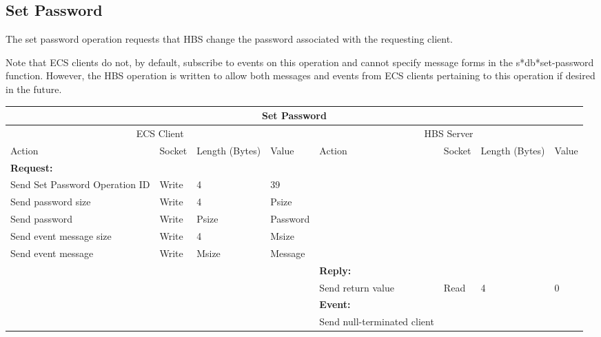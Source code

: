 \newpage
\subsection{Set Password}

The set password operation requests that HBS change the password
associated with the requesting client. 

Note that ECS clients do not, by default, subscribe to events on this
operation and cannot specify message forms in the s*db*set-password
function.  However, the HBS operation is written to allow both messages and
events from ECS clients pertaining to this operation if desired in the future.

\bigskip
\small
\begin{tabular}{|p{1.2in}|p{.4in}|p{.4in}|p{.5in}|p{1.2in}|p{.4in}|p{.4in}|p{.5in} |} \hline
\multicolumn{8}{|c|}{{\bf Set Password}} \\ \hline
\multicolumn{4}{|c|}{ECS Client} & \multicolumn{4}{|c|}{HBS Server} \\ \hline
Action            & Socket & Length  
                            (Bytes)& Value & Action       & Socket & Length 
                                                                    (Bytes)& Value \\ \hline
\multicolumn{4}{|l}{{\bf Request:}}&\multicolumn{4}{|l|}{~} \\ \hline
Send Set Password Operation ID  & Write  & 4     & 39     &              &        &       &       \\ \hline
Send password
size              & Write  & 4     &  Psize &         &        &       &       \\ \hline
Send 
password          & Write  &  Psize  & Password &     &        &       &       \\ \hline
Send event
message size      & Write  & 4     &  Msize &         &        &       &       \\ \hline
Send event message
                  & Write  &  Msize  &  Message &     &        &       &       \\ \hline
\multicolumn{4}{|l}{~}&\multicolumn{4}{|l|}{{\bf Reply:}} \\ \hline
                  &        &       &       & Send return
                                             value        & Read   &  4    & 0       \\ \hline
\multicolumn{4}{|l}{~}&\multicolumn{4}{|l|}{{\bf Event:}} \\ \hline
                  &        &       &       & Send null-terminated client

\end{tabular}
